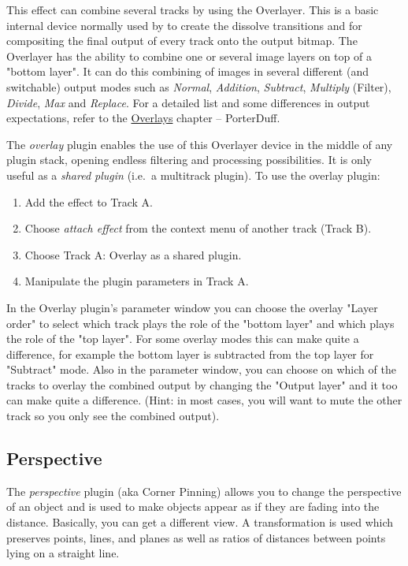 This effect can combine several tracks by using the Overlayer. This is a basic internal device normally used by \CGGI{} to create the dissolve transitions and for compositing the final output of every track onto the output bitmap. The Overlayer has the ability to combine one or several image layers on top of a "bottom layer". It can do this combining of images in several different (and switchable) output modes such as \textit{Normal}, \textit{Addition}, \textit{Subtract}, \textit{Multiply} (Filter), \textit{Divide}, \textit{Max} and \textit{Replace}. For a detailed list and some differences in output expectations, refer to the \hyperref[cha:overlays]{Overlays} chapter  -- PorterDuff.


The \textit{overlay} plugin enables the use of this Overlayer device in the middle of any plugin stack, opening endless filtering and processing possibilities. It is only useful as a \textit{shared plugin} (i.e.\ a multitrack plugin). To use the overlay plugin:

\begin{enumerate}
    \item Add the effect to Track A.
    \item Choose \textit{attach effect} from the context menu of another track (Track B).
    \item Choose Track A: Overlay as a shared plugin.
    \item Manipulate the plugin parameters in Track A.
\end{enumerate}

In the Overlay plugin's parameter window you can choose the overlay "Layer order"
to select which track plays the role of the "bottom layer" and which plays the
role of the "top layer". For some overlay modes this can make quite a
difference, for example the bottom layer is subtracted from the top layer for
"Subtract" mode. Also in the parameter window, you can choose on which of the tracks
to overlay the combined output by changing the "Output layer" and it too can make
quite a difference.
(Hint: in most cases, you will want to mute the other track so you only see the
combined output).

\subsection{Perspective}%
\label{sub:perspective}

The \textit{perspective} plugin (aka Corner Pinning) allows you to change the perspective of an object and is used to make objects appear as if they are fading into the distance. Basically, you can get a different view. A transformation is used which preserves points, lines, and planes as well as ratios of distances between points lying on a straight line.

